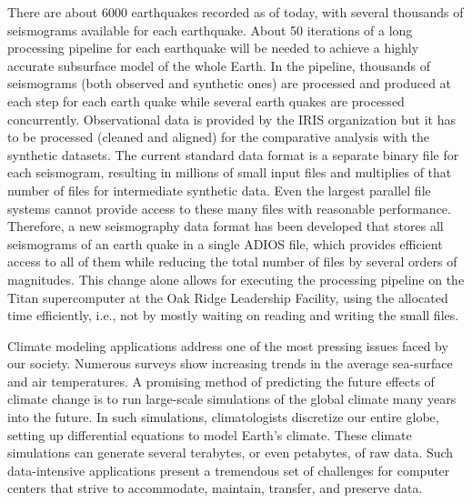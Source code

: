 There are about 6000 earthquakes recorded as of today, with several thousands of seismograms
available for each earthquake. About 50 iterations of a long processing pipeline for each earthquake
will be needed to achieve a highly accurate subsurface model of the whole Earth. In the pipeline,
thousands of seismograms (both observed and synthetic ones) are processed and produced at each step
for each earth quake while several earth quakes are processed concurrently. Observational data is
provided by the IRIS organization but it has to be processed (cleaned and aligned) for the
comparative analysis with the synthetic datasets. The current standard data format is a separate
binary file for each seismogram, resulting in millions of small input files and multiplies of that
number of files for intermediate synthetic data. Even the largest parallel file systems cannot
provide access to these many files with reasonable performance. Therefore, a new seismography data
format has been developed that stores all seismograms of an earth quake in a single ADIOS file, which
provides efficient access to all of them while reducing the total number of files by several orders
of magnitudes. This change alone allows for executing the processing pipeline on the Titan
supercomputer at the Oak Ridge Leadership Facility, using the allocated time efficiently, i.e., not
by mostly waiting on reading and writing the small files.
 
\vspace{10pt}


Climate modeling applications address one of the most pressing issues faced by our society. Numerous
surveys show increasing trends in the average sea-surface and air temperatures. A promising method
of predicting the future effects of climate change is to run large-scale simulations of the global
climate many years into the future. In such simulations, climatologists discretize our entire globe,
setting up differential equations to model Earth's climate. These climate simulations can generate
several terabytes, or even petabytes, of raw data. Such data-intensive applications present a
tremendous set of challenges for computer centers that strive to accommodate, maintain, transfer,
and preserve data.

